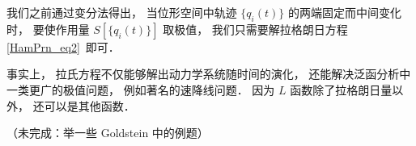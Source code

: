 

我们之前通过变分法得出， 当位形空间中轨迹 $\{q_i(t)\}$ 的两端固定而中间变化时， 要使作用量 $S[\{q_i(t)\}]$ 取极值， 我们只需要解拉格朗日方程\autoref{HamPrn_eq2}~即可．

事实上， 拉氏方程不仅能够解出动力学系统随时间的演化， 还能解决泛函分析中一类更广的极值问题， 例如著名的速降线问题． 因为 $L$ 函数除了拉格朗日量以外， 还可以是其他函数．

（未完成：举一些 Goldstein 中的例题）
